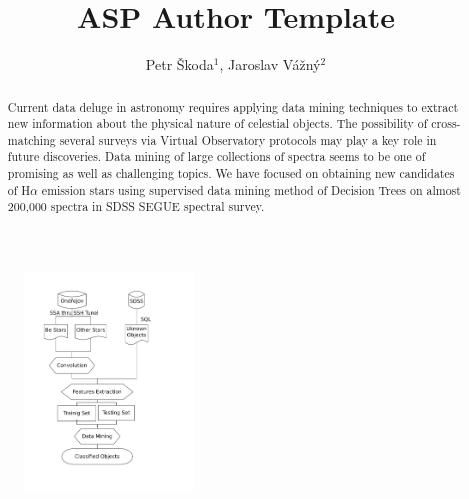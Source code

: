 \documentclass[11pt,twoside]{article}
\begin{document}


\title{ASP Author Template}
\author{Petr \v{S}koda$^1$, Jaroslav V\'{a}\v{z}n\'{y}$^2$
}

\begin{abstract}Current data deluge in
astronomy requires applying data mining techniques to extract new
information about the physical nature of celestial objects. The
possibility of cross-matching several surveys via Virtual Observatory
protocols may play a key role in future discoveries. Data mining of
large collections of spectra seems to be one of promising as well as
challenging topics.  We have focused on obtaining new candidates of
H$\alpha$ emission stars using supervised data mining method of
Decision Trees on almost 200,000 spectra in SDSS SEGUE spectral
survey.
\end{abstract}

   \begin{figure}
     \vspace{-50pt}
     \begin{center}
       \includegraphics[width=0.4\textwidth]{flowSpectra}
     \end{center}
     \vspace{-50pt}
   \end{figure}
\end{document}

